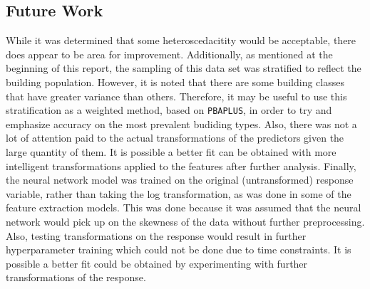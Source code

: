 \subsection{Future Work}
While it was determined that some heteroscedacitity would be acceptable, there does appear to be area for improvement.  Additionally, as mentioned at the beginning of this report, the sampling of this data set was stratified to reflect the building population.  However, it is noted that there are some building classes that have greater variance than others.  Therefore, it may be useful to use this stratification as a weighted method, based on \lstinline{PBAPLUS}, in order to try and emphasize accuracy on the most prevalent budiding types. Also, there was not a lot of attention paid to the actual transformations of the predictors given the large quantity of them.  It is possible a better fit can be obtained with more intelligent transformations applied to the features after further analysis.  Finally, the neural network model was trained on the original (untransformed) response variable, rather than taking the log transformation, as was done in some of the feature extraction models.  This was done because it was assumed that the neural network would pick up on the skewness of the data without further preprocessing.  Also, testing transformations on the response would result in further hyperparameter training which could not be done due to time constraints.  It is possible a better fit could be obtained by experimenting with further transformations of the response.


